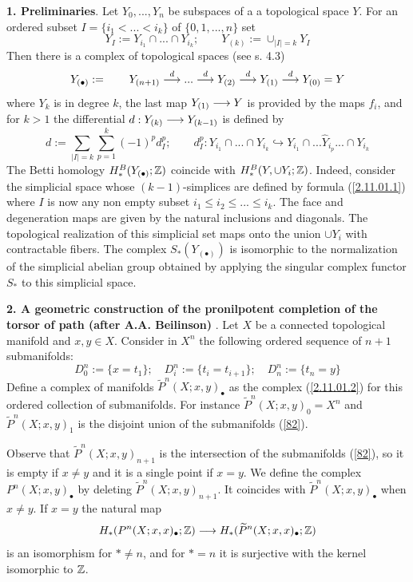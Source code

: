 \documentclass[10pt]{article}
\begin{document}
{\bf 1. Preliminaries}. 
Let $Y_0, ..., Y_n$ be subspaces of a   a topological space $Y$. 
For an ordered subset $I = \{i_1 < ... < i_k\}$ 
of $\{0, 1, ..., n\}$ set 
\begin{equation} \label{2.11.01.1}
Y_I:= Y_{i_1} \cap ... \cap Y_{i_k}; \qquad Y_{(k)}:= \cup_{|I|=k}Y_I
\end{equation}
Then there is a complex of topological spaces (see s. 4.3)
\begin{equation} \label{2.11.01.2}
Y_{(\bullet)}:= \qquad Y_{(n+1)} \stackrel{d}{\longrightarrow} ... \stackrel{d}{\longrightarrow} Y_{(2)} 
\stackrel{d}{\longrightarrow} Y_{(1)} \stackrel{d}{\longrightarrow} Y_{(0)} = Y
\end{equation}
where $Y_k$ is in degree $k$, 
the last map $Y_{(1)} \longrightarrow Y$ is provided by the maps $f_i$, 
and for $k >1$ the differential $d: Y_{(k)} \longrightarrow Y_{(k-1)}$ 
is defined by 
$$
d := \sum_{|I|=k}\sum_{p=1}^k(-1)^p d_I^p; \qquad d_I^p: Y_{i_1} \cap  ...\cap    Y_{i_k} 
\hookrightarrow Y_{i_1} \cap  ... \widehat Y_{i_p} ... \cap  Y_{i_k}
$$
The Betti homology  $H^B_*(Y_{(\bullet)}; {\mathbb Z})$ 
coincide with 
$H^B_*(Y, \cup Y_i; {\mathbb Z})$. Indeed, consider the simplicial space 
whose $(k-1)$-simplices are defined by formula (\ref{2.11.01.1}) where $I$ is now any non empty 
subset $i_1 \leq i_2 \leq ... \leq i_k$. The face and degeneration maps are 
given 
by the natural inclusions and  diagonals. 
The topological realization of this simplicial set maps onto the union 
$\cup Y_i$ with    contractable fibers. 
The complex $S_*(Y_{(\bullet)})$ is isomorphic to the normalization   of 
the simplicial abelian group obtained by  applying the singular complex functor $S_*$ 
to this simplicial space. 


{\bf 2. A geometric construction of the pronilpotent completion of the torsor of path 
(after A.A. Beilinson) }. 
Let $X$ be a connected topological manifold and $x, y \in X$. Consider in $X^n$ the  
following ordered sequence of  $n+1$ submanifolds: 
\begin{equation} \label{82}
D^n_0:= \{x = t_1\}; \quad  D^n_i:= \{t_i = t_{i+1}\}; \quad D^n_n := \{t_n = y\}
\end{equation}
Define a complex of manifolds $\widetilde P^n(X; x,y)_{\bullet}$ as 
the  complex (\ref{2.11.01.2})  
for  this ordered collection 
of submanifolds.  For instance  
$\widetilde P^n(X; x,y)_{0} =X^n$ and $\widetilde P^n(X; x,y)_{1}$ is 
the disjoint union of the submanifolds 
(\ref{82}). 

Observe that $\widetilde P^n(X; x,y)_{n+1} $ is the 
intersection of the submanifolds (\ref{82}),  so it is 
empty if $x \not = y$ and it is 
a single point if $x=y$. 
We define the  complex  $P^n(X; x,y)_{\bullet}$ by 
deleting $\widetilde P^n(X; x,y)_{n+1} $. It coincides with $ \widetilde 
P^n(X; x,y)_{\bullet}$ when $x \not = y$. If $x=y$  the natural map 
\begin{equation} \label{2.11.01.3}
H_*(P^n(X; x,x)_{\bullet}; {\mathbb Z})  \longrightarrow H_*(\widetilde P^n(X; x,x)_{\bullet}; {\mathbb Z})
\end{equation}
is an isomorphism for $* \not = n$, and for $*  = n$ it is surjective 
with the  kernel  isomorphic to ${\mathbb Z}$. 
\end{document}
